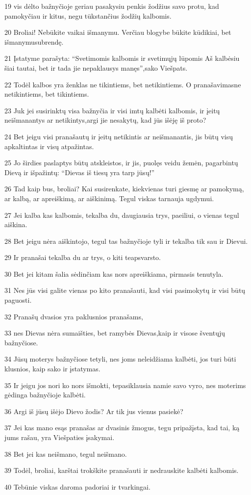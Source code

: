 \par 19 vis dėlto bažnyčioje geriau pasakysiu penkis žodžius savo protu, kad pamokyčiau ir kitus, negu tūkstančius žodžių kalbomis. 
\par 20 Broliai! Nebūkite vaikai išmanymu. Verčiau blogybe būkite kūdikiai, bet išmanymu­subrendę. 
\par 21 Įstatyme parašyta: “Svetimomis kalbomis ir svetimųjų lūpomis Aš kalbėsiu šiai tautai, bet ir tada jie nepaklausys manęs”,­sako Viešpats. 
\par 22 Todėl kalbos yra ženklas ne tikintiems, bet netikintiems. O pranašavimas­ne netikintiems, bet tikintiems. 
\par 23 Juk jei susirinktų visa bažnyčia ir visi imtų kalbėti kalbomis, ir įeitų neišmanantys ar netikintys,­argi jie nesakytų, kad jūs išėję iš proto? 
\par 24 Bet jeigu visi pranašautų ir įeitų netikintis ar neišmanantis, jis būtų visų apkaltintas ir visų atpažintas. 
\par 25 Jo širdies paslaptys būtų atskleistos, ir jis, puolęs veidu žemėn, pagarbintų Dievą ir išpažintų: “Dievas iš tiesų yra tarp jūsų!” 
\par 26 Tad kaip bus, broliai? Kai susirenkate, kiekvienas turi giesmę ar pamokymą, ar kalbą, ar apreiškimą, ar aiškinimą. Tegul viskas tarnauja ugdymui. 
\par 27 Jei kalba kas kalbomis, tekalba du, daugiausia trys, paeiliui, o vienas tegul aiškina. 
\par 28 Bet jeigu nėra aiškintojo, tegul tas bažnyčioje tyli ir tekalba tik sau ir Dievui. 
\par 29 Ir pranašai tekalba du ar trys, o kiti teapsvarsto. 
\par 30 Bet jei kitam šalia sėdinčiam kas nors apreiškiama, pirmasis tenutyla. 
\par 31 Nes jūs visi galite vienas po kito pranašauti, kad visi pasimokytų ir visi būtų paguosti. 
\par 32 Pranašų dvasios yra paklusnios pranašams, 
\par 33 nes Dievas nėra sumaišties, bet ramybės Dievas,­kaip ir visose šventųjų bažnyčiose. 
\par 34 Jūsų moterys bažnyčiose tetyli, nes joms neleidžiama kalbėti, jos turi būti klusnios, kaip sako ir įstatymas. 
\par 35 Ir jeigu jos nori ko nors išmokti, tepasiklausia namie savo vyro, nes moterims gėdinga bažnyčioje kalbėti. 
\par 36 Argi iš jūsų išėjo Dievo žodis? Ar tik jus vienus pasiekė? 
\par 37 Jei kas mano esąs pranašas ar dvasinis žmogus, tegu pripažįsta, kad tai, ką jums rašau, yra Viešpaties įsakymai. 
\par 38 Bet jei kas neišmano, tegul neišmano. 
\par 39 Todėl, broliai, karštai trokškite pranašauti ir nedrauskite kalbėti kalbomis. 
\par 40 Tebūnie viskas daroma padoriai ir tvarkingai.


